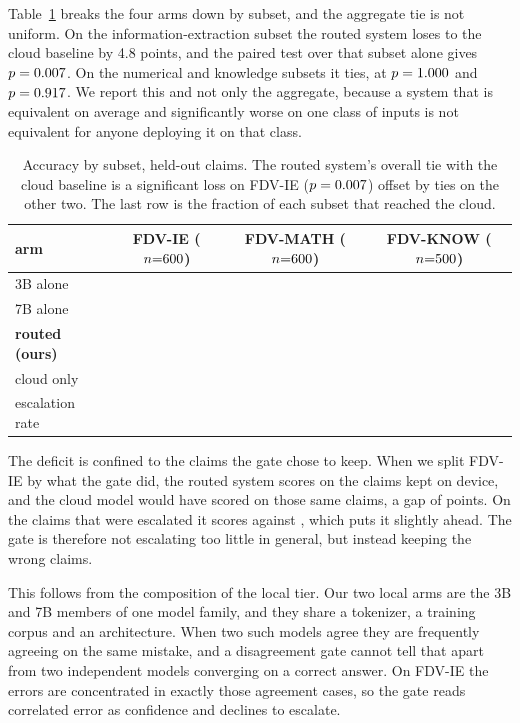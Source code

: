 \documentclass{article}
\begin{document}
Table~\ref{tab:subset} breaks the four arms down by subset, and the aggregate tie is not
uniform. On the information-extraction subset the routed system loses to the cloud baseline
by 4.8 points, and the paired test over that subset alone gives $p = 0.007{}$. On the
numerical and knowledge subsets it ties, at $p = 1.000{}$ and $p = 0.917{}$.
We report this and not only the aggregate, because a system that is equivalent on average
and significantly worse on one class of inputs is not equivalent for anyone deploying it on
that class.

\begin{table}[t]
\caption{Accuracy by subset, \nTest{} held-out claims. The routed system's overall tie with
the cloud baseline is a significant loss on FDV-IE ($p = 0.007{}$) offset by ties on
the other two. The last row is the fraction of each subset that reached the cloud.}
\label{tab:subset}
\centering
\begin{tabular}{lccc}
\toprule
arm & FDV-IE ($n{=}600{}$) & FDV-MATH ($n{=}600{}$) & FDV-KNOW ($n{=}500{}$) \\
\midrule
3B alone               & \accThreeBIE{}   & \accThreeBMATH{}   & \accThreeBKNOW{} \\
7B alone               & \accSevenBIE{}   & \accSevenBMATH{}   & \accSevenBKNOW{} \\
\textbf{routed (ours)} & \textbf{\accRoutedIE{}} & \textbf{\accRoutedMATH{}} & \textbf{\accRoutedKNOW{}} \\
cloud only             & \accCloudIE{}    & \accCloudMATH{}    & \accCloudKNOW{} \\
\midrule
escalation rate        & \escRateIE{}     & \escRateMATH{}     & \escRateKNOW{} \\
\bottomrule
\end{tabular}
\end{table}

The deficit is confined to the claims the gate chose to keep. When we split FDV-IE by what
the gate did, the routed system scores \keptLocalIERouted{} on the \keptLocalIEn{} claims
kept on device, and the cloud model would have scored \keptLocalIECloud{} on those same
claims, a gap of \keptLocalIEGap{} points. On the \escalatedIEn{} claims that were
escalated it scores \escalatedIERouted{} against \escalatedIECloud{}, which puts it
slightly ahead. The gate is therefore not escalating too little in general, but instead
keeping the wrong claims.

This follows from the composition of the local tier. Our two local arms are the 3B and 7B
members of one model family, and they share a tokenizer, a training corpus and an
architecture. When two such models agree they are frequently agreeing on the same mistake,
and a disagreement gate cannot tell that apart from two independent models converging on a
correct answer. On FDV-IE the errors are concentrated in exactly those agreement cases, so
the gate reads correlated error as confidence and declines to escalate.
\end{document}
